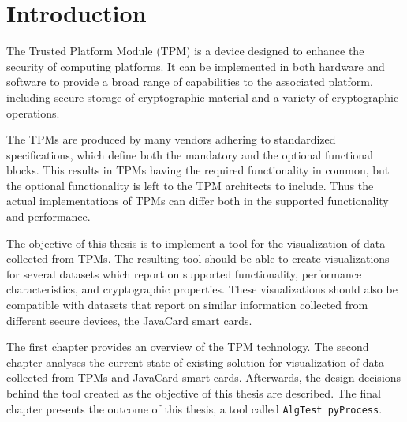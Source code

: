 \chapter{Introduction}
The Trusted Platform Module (TPM) is a device designed to enhance the security of computing platforms. It can be implemented in both hardware and software to provide a broad range of capabilities to the associated platform, including secure storage of cryptographic material and a variety of cryptographic operations.

The TPMs are produced by many vendors adhering to standardized specifications, which define both the mandatory and the optional functional blocks. This results in TPMs having the required functionality in common, but the optional functionality is left to the TPM architects to include. Thus the actual implementations of TPMs can differ both in the supported functionality and performance.

The objective of this thesis is to implement a tool for the visualization of data collected from TPMs. The resulting tool should be able to create visualizations for several datasets which report on supported functionality, performance characteristics, and cryptographic properties. These visualizations should also be compatible with datasets that report on similar information collected from different secure devices, the JavaCard smart cards.

The first chapter provides an overview of the TPM technology. The second chapter analyses the current state of existing solution for visualization of data collected from TPMs and JavaCard smart cards. Afterwards, the design decisions behind the tool created as the objective of this thesis are described. The final chapter presents the outcome of this thesis, a tool called \texttt{AlgTest pyProcess}.
